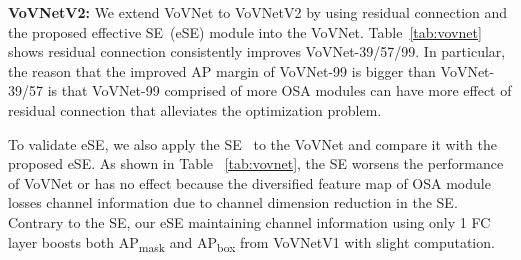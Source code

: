 \documentclass[10pt,twocolumn,letterpaper]{article}
\begin{document}
\noindent
\textbf{VoVNetV2:}
We extend VoVNet to VoVNetV2 by using residual connection and the proposed effective SE~(eSE) module into the VoVNet.
Table~\ref{tab:vovnet} shows residual connection consistently improves VoVNet-39/57/99.
In particular, the reason that the improved AP margin of VoVNet-99 is bigger than VoVNet-39/57 is that VoVNet-99 comprised of more OSA modules can have more effect of residual connection that alleviates the optimization problem.

To validate eSE, we also apply the SE~\cite{hu2018squeeze} to the VoVNet and compare it with the proposed eSE.
As shown in Table ~\ref{tab:vovnet}, the SE worsens the performance of VoVNet or has no effect because the diversified feature map of OSA module losses channel information due to channel dimension reduction in the SE.
Contrary to the SE, our eSE maintaining channel information using only 1 FC layer boosts both AP\textsubscript{mask} and AP\textsubscript{box} from VoVNetV1 with slight computation.
\\
\end{document}
